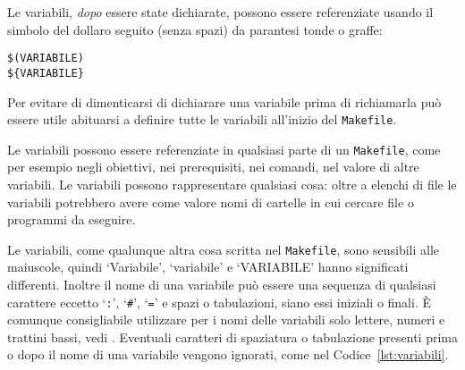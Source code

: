 Le variabili, \emph{dopo} essere state dichiarate, possono essere referenziate
usando il simbolo del dollaro seguito (senza spazi) da parantesi tonde o graffe:
\begin{lstlisting}
$(VARIABILE)
${VARIABILE}
\end{lstlisting}
Per evitare di dimenticarsi di dichiarare una variabile prima di richiamarla può
essere utile abituarsi a definire tutte le variabili all'inizio del
\verb|Makefile|.

Le variabili possono essere referenziate in qualsiasi parte di un
\verb|Makefile|, come per esempio negli obiettivi, nei prerequisiti, nei
comandi, nel valore di altre variabili.  Le variabili possono rappresentare
qualsiasi cosa: oltre a elenchi di file le variabili potrebbero avere come
valore nomi di cartelle in cui cercare file o programmi da eseguire.

Le variabili, come qualunque altra cosa scritta nel \verb|Makefile|, sono
sensibili alle maiuscole, quindi `Variabile', `variabile' e `VARIABILE' hanno
significati differenti.  Inoltre il nome di una variabile può essere una
sequenza di qualsiasi carattere eccetto `\verb|:|', `\verb|#|', `\verb|=|' e
spazi o tabulazioni, siano essi iniziali o finali.  È comunque consigliabile
utilizzare per i nomi delle variabili solo lettere, numeri e trattini bassi,
vedi \textcite[57]{gnu:make}.  Eventuali caratteri di spaziatura o tabulazione
presenti prima o dopo il nome di una variabile vengono ignorati, come nel
Codice~\ref{lst:variabili}.

